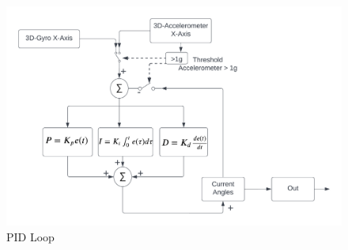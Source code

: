 \begin{figure}[H]
  \begin{center}
    \includegraphics[width=1\linewidth]{content/images/PID_Loop.png}
    \caption{PID Loop}
  \end{center}
\end{figure}

  
